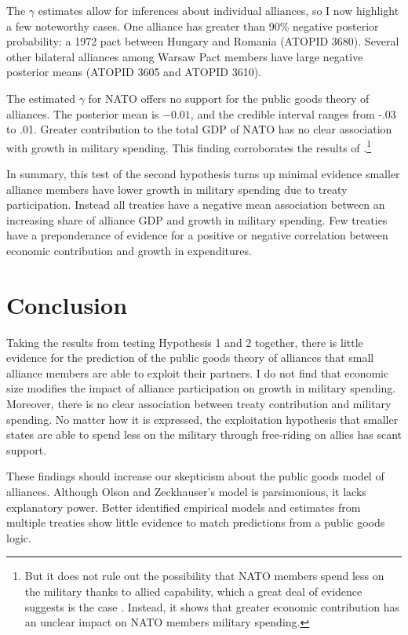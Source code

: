\documentclass[12pt]{article}
\begin{document}
The $\gamma$ estimates allow for inferences about individual alliances, so I now highlight a few noteworthy cases. 
One alliance has greater than 90\% negative posterior probability: a 1972 pact between Hungary and Romania (ATOPID 3680). 
Several other bilateral alliances among Warsaw Pact members have large negative posterior means (ATOPID 3605 and ATOPID 3610). 

 
The estimated $\gamma$ for NATO offers no support for the public goods theory of alliances. 
The posterior mean is $-0.01$, and the credible interval ranges from -.03 to .01.  
Greater contribution to the total GDP of NATO has no clear association with growth in military spending. 
This finding corroborates the results of \citet{PluemperNeumayer2015}.\footnote{But it does not rule out the possibility that NATO members spend less on the military thanks to allied capability, which a great deal of evidence suggests is the case \citep{GeorgeSandler2017}. Instead, it shows that greater economic contribution has an unclear impact on NATO members military spending.}


In summary, this test of the second hypothesis turns up minimal evidence smaller alliance members have lower growth in military spending due to treaty participation. 
Instead all treaties have a negative mean association between an increasing share of alliance GDP and growth in military spending. 
Few treaties have a preponderance of evidence for a positive or negative correlation between economic contribution and growth in expenditures.  
 


\section{Conclusion}

Taking the results from testing Hypothesis 1 and 2 together, there is little evidence for the prediction of the public goods theory of alliances that small alliance members are able to exploit their partners. 
I do not find that economic size modifies the impact of alliance participation on growth in military spending.
Moreover, there is no clear association between treaty contribution and military spending. 
No matter how it is expressed, the exploitation hypothesis that smaller states are able to spend less on the military through free-riding on allies has scant support. 


These findings should increase our skepticism about the public goods model of alliances. 
Although Olson and Zeckhauser's model is parsimonious, it lacks explanatory power. 
Better identified empirical models and estimates from multiple treaties show little evidence to match predictions from a public goods logic. 
\end{document}
